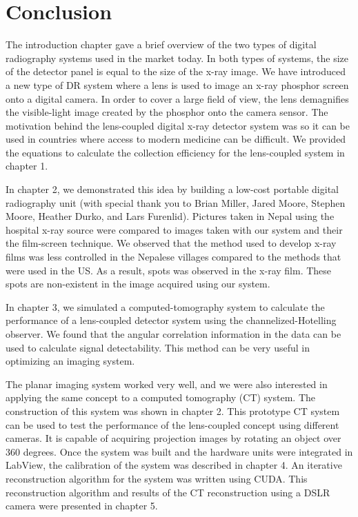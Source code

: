 \chapter{Conclusion}
The introduction chapter gave a brief overview of the two types of digital radiography systems used in the market today.  In both types of systems, the size of the detector panel is equal to the size of the x-ray image.  We have introduced a new type of DR system where a lens is used to image an x-ray phosphor screen onto a digital camera.  In order to cover a large field of view, the lens demagnifies the visible-light image created by the phosphor onto the camera sensor.  The motivation behind the lens-coupled digital x-ray detector system was so it can be used in countries where access to modern medicine can be difficult.  We provided the equations to calculate the collection efficiency for the lens-coupled system in chapter 1.  

In chapter 2, we demonstrated this idea by building a low-cost portable digital radiography unit (with special thank you to Brian Miller, Jared Moore, Stephen Moore, Heather Durko, and Lars Furenlid).  Pictures taken in Nepal using the hospital x-ray source were compared to images taken with our system and their the film-screen technique.  We observed that the method used to develop x-ray films was less controlled in the Nepalese villages compared to the methods that were used in the US.  As a result, spots was observed in the x-ray film.  These spots are non-existent in the image acquired using our system.  

In chapter 3, we simulated a computed-tomography system to calculate the performance of a lens-coupled detector system using the channelized-Hotelling observer.  We found that the angular correlation information in the data can be used to calculate signal detectability.  This method can be very useful in optimizing an imaging system.  

The planar imaging system worked very well, and we were also interested in applying the same concept to a computed tomography (CT) system.  The construction of this system was shown in chapter 2.  This prototype CT system can be used to test the performance of the lens-coupled concept using different cameras.  It is capable of acquiring projection images by rotating an object over 360 degrees.  Once the system was built and the hardware units were integrated in LabView, the calibration of the system was described in chapter 4.  An iterative reconstruction algorithm for the system was written using CUDA.  This reconstruction algorithm and results of the CT reconstruction using a DSLR camera were presented in chapter 5.  

